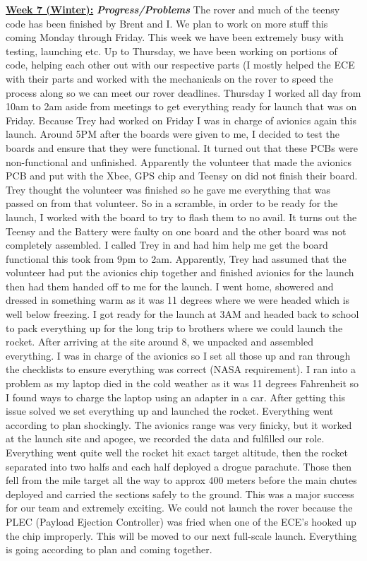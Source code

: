 \documentclass[onecolumn, draftclsnofoot, 10pt, compsoc]{IEEEtran}
\begin{document}
\underline{\textbf{Week 7 (Winter):}}
\newline\textbf{\textit{{Progress/Problems}}}
\newline The rover and much of the teensy code has been finished by Brent and I. We plan to work on more stuff this coming Monday through Friday. This week we have been extremely busy with testing, launching etc. Up to Thursday, we have been working on portions of code, helping each other out with our respective parts (I mostly helped the ECE with their parts and worked with the mechanicals on the rover to speed the process along so we can meet our rover deadlines. Thursday I worked all day from 10am to 2am aside from meetings to get everything ready for launch that was on Friday. Because Trey had worked on Friday I was in charge of avionics again this launch. Around 5PM after the boards were given to me, I decided to test the boards and ensure that they were functional. It turned out that these PCBs were non-functional and unfinished. Apparently the volunteer that made the avionics PCB and put with the Xbee, GPS chip and Teensy on did not finish their board. Trey thought the volunteer was finished so he gave me everything that was passed on from that volunteer. So in a scramble, in order to be ready for the launch, I worked with the board to try to flash them to no avail. It turns out the Teensy and the Battery were faulty on one board and the other board was not completely assembled. I called Trey in and had him help me get the board functional this took from 9pm to 2am. Apparently, Trey had assumed that the volunteer had put the avionics chip together and finished avionics for the launch then had them handed off to me for the launch. I went home, showered and dressed in something warm as it was 11 degrees where we were headed which is well below freezing. I got ready for the launch at 3AM and headed back to school to pack everything up for the long trip to brothers where we could launch the rocket. After arriving at the site around 8, we unpacked and assembled everything. I was in charge of the avionics so I set all those up and ran through the checklists to ensure everything was correct (NASA requirement). I ran into a problem as my laptop died in the cold weather as it was 11 degrees Fahrenheit so I found ways to charge the laptop using an adapter in a car. After getting this issue solved we set everything up and launched the rocket. Everything went according to plan shockingly. The avionics range was very finicky, but it worked at the launch site and apogee, we recorded the data and fulfilled our role. Everything went quite well the rocket hit exact target altitude, then the rocket separated into two halfs and each half deployed a drogue parachute. Those then fell from the mile target all the way to approx 400 meters before the main chutes deployed and carried the sections safely to the ground. This was a major success for our team and extremely exciting. We could not launch the rover because the PLEC (Payload Ejection Controller)  was fried when one of the ECE's hooked up the chip improperly. This will be moved to our next full-scale launch. Everything is going according to plan and coming together. \\
\end{document}

